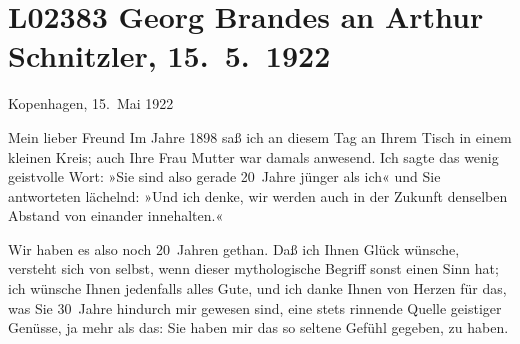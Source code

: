 

\section[Georg Brandes an Arthur Schnitzler, 15. 5. 1922]{L02383 Georg Brandes an Arthur Schnitzler, 15. 5. 1922}
\nopagebreak{}
\rehead{ }\normalsize\beginnumbering{}
\toendnotes[C]{\smallbreak\pagebreak[2]}\toendnotes[C]{\smallbreak}
\pstart
           \raggedleft{}{\pb}Kopenhagen, 15. Mai 1922\pend
           
\pstart{}Mein lieber Freund\pend\vspace{0.5em}
\pstart
           Im Jahre 1898 saß ich an diesem Tag an Ihrem Tisch in einem kleinen
               Kreis; auch Ihre Frau Mutter
               war damals anwesend. Ich sagte das wenig geistvolle Wort: »Sie sind also gerade
               20 Jahre jünger als ich« und Sie antworteten lächelnd: »Und ich denke, wir werden
               auch in der Zukunft denselben Abstand von einander innehalten.«\pend
           
\pstart
           Wir haben es also noch 20 Jahren gethan. Daß ich Ihnen Glück wünsche, versteht sich
               von selbst, wenn dieser mythologische Begriff sonst einen Sinn hat; ich wünsche Ihnen
               jedenfalls alles Gute, und ich danke Ihnen von Herzen für das, was Sie 30 Jahre
               hindurch mir gewesen sind, eine stets rinnende Quelle geistiger Genüsse, ja mehr als
               das: Sie haben mir das so seltene Gefühl gegeben, \emph{\label{K_L02383-1v}\label{K_L02383-1}} zu haben.\pend
           
